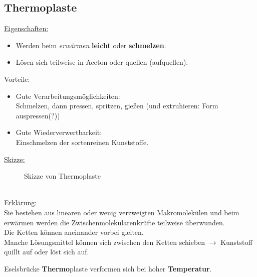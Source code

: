 \documentclass[../../main.tex]{subfiles}
\begin{document}
\subsection{Thermoplaste}
\underline{Eigenschaften:}
\begin{itemize}
    \item Werden beim \textit{erwärmen} \textbf{leicht} oder \textbf{schmelzen}.
    \item Lösen sich teilweise in Aceton oder quellen (aufquellen).
\end{itemize}
Vorteile:
\begin{itemize}
    \item Gute Verarbeitungsmöglichkeiten:\\
        Schmelzen, dann pressen, spritzen, gießen (und extruhieren: Form auspressen(?))
    \item Gute Wiederverwertbarkeit: \\
        Einschmelzen der sortenreinen Kunststoffe.
\end{itemize}
\underline{Skizze:}
\begin{figure}[ht]
    \centering
    \caption{Skizze von Thermoplaste}
    \label{fig:skizze_thermoplaste}
\end{figure}
\\
\underline{Erklärung:} \\
Sie bestehen aus linearen oder wenig verzweigten Makromolekülen und beim
erwärmen werden die Zwischenmolekularenkrüfte teilweise überwunden. \\
Die Ketten können aneinander vorbei gleiten. \\
Manche Lösungsmittel können sich zwischen den Ketten schieben $\rightarrow$
Kunststoff quillt auf oder löst sich auf. \\
\begin{merke}{Eselsbrücke}
    \textbf{Thermo}plaste verformen sich bei hoher
    \textbf{Temperatur}.
\end{merke}
%
%
\end{document}
